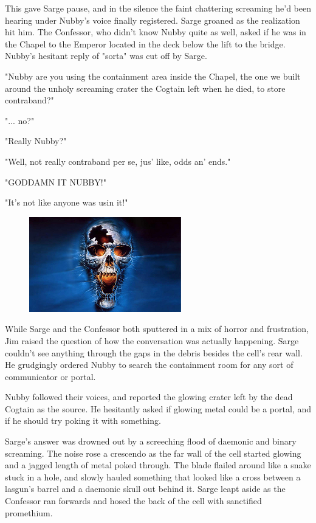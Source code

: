 This gave Sarge pause, and in the silence the faint chattering screaming he'd been hearing under Nubby's voice finally registered. 
Sarge groaned as the realization hit him. 
The Confessor, who didn't know Nubby quite as well, asked if he was in the Chapel to the Emperor located in the deck below the lift to the bridge. 
Nubby's hesitant reply of "sorta" was cut off by Sarge. 


"Nubby are you using the containment area inside the Chapel, the one we built around the unholy screaming crater the Cogtain left when he died, to store contraband?"

"... 
no?"

"Really Nubby?"

"Well, not really contraband per se, jus' like, odds an' ends."

"GODDAMN IT NUBBY!"

"It's not like anyone was usin it!"

\begin{figure}
	\begin{center}
		\includegraphics[width=\figwidth]{pics/12/4.png}
	\end{center}
\end{figure}
While Sarge and the Confessor both sputtered in a mix of horror and frustration, Jim raised the question of how the conversation was actually happening. 
Sarge couldn't see anything through the gaps in the debris besides the cell's rear wall. 
He grudgingly ordered Nubby to search the containment room for any sort of communicator or portal.

Nubby followed their voices, and reported the glowing crater left by the dead Cogtain as the source. 
He hesitantly asked if glowing metal could be a portal, and if he should try poking it with something.

Sarge's answer was drowned out by a screeching flood of daemonic and binary screaming. 
The noise rose a crescendo as the far wall of the cell started glowing and a jagged length of metal poked through. 
The blade flailed around like a snake stuck in a hole, and slowly hauled something that looked like a cross between a lasgun's barrel and a daemonic skull out behind it. 
Sarge leapt aside as the Confessor ran forwards and hosed the back of the cell with sanctified promethium.


